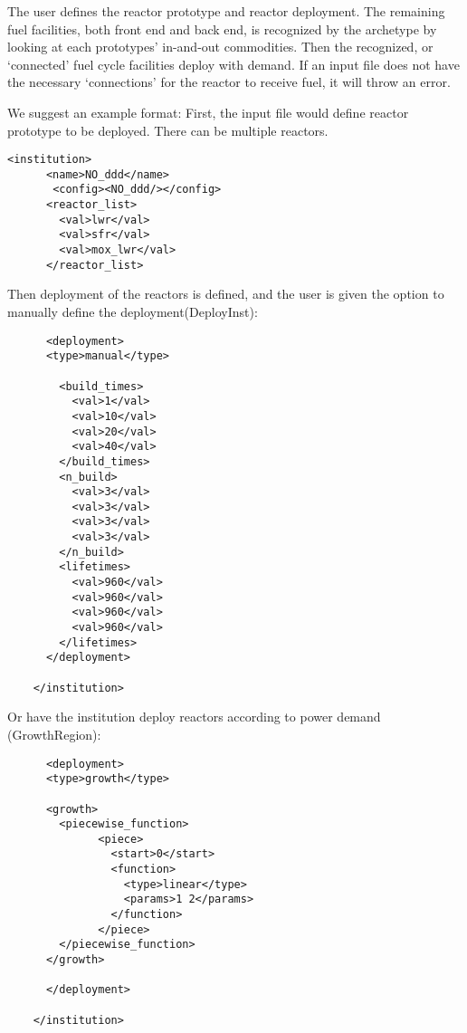 \documentclass[12pt,letterpaper]{article}
\begin{document}
The user defines the reactor prototype and reactor deployment. 
The remaining fuel facilities,
both front end and back end, is recognized by the archetype
by looking at each prototypes' in-and-out commodities.
Then the recognized, or `connected' fuel cycle facilities deploy
with demand.
If an input file does not have the necessary `connections' for the 
reactor to receive fuel, it will throw an error. 

We suggest an example format:
First, the input file would define reactor prototype to be deployed. There can be multiple reactors.

\begin{verbatim}
<institution>
      <name>NO_ddd</name>
       <config><NO_ddd/></config>
      <reactor_list>
        <val>lwr</val>
        <val>sfr</val>
        <val>mox_lwr</val>
      </reactor_list>
\end{verbatim}

Then deployment of the reactors is defined, and the user
is given the option to manually define the deployment(DeployInst):
\begin{verbatim}
      <deployment>
      <type>manual</type>

        <build_times>
          <val>1</val>
          <val>10</val>
          <val>20</val>
          <val>40</val>
        </build_times>
        <n_build>
          <val>3</val>
          <val>3</val>
          <val>3</val>
          <val>3</val>
        </n_build>
        <lifetimes>
          <val>960</val>
          <val>960</val>
          <val>960</val>
          <val>960</val>
        </lifetimes>
      </deployment>

    </institution>
\end{verbatim}

Or have the institution deploy reactors according to power demand (GrowthRegion):

\begin{verbatim}
      <deployment>
      <type>growth</type>

      <growth>
        <piecewise_function>
              <piece>
                <start>0</start>
                <function>
                  <type>linear</type>
                  <params>1 2</params>
                </function>
              </piece>
        </piecewise_function>
      </growth>
      
      </deployment>

    </institution>
\end{verbatim}
\end{document}
